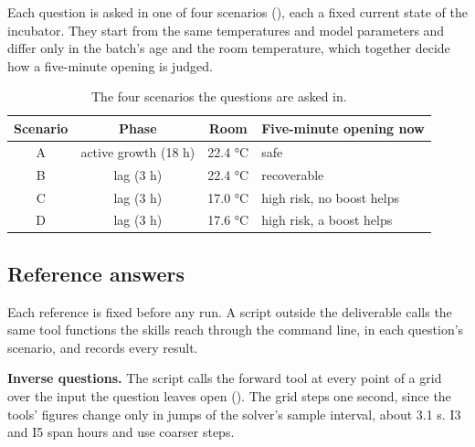   Each question is asked in one of four scenarios (), each a fixed current
  state of the incubator. They start from the same temperatures and model parameters and differ
  only in the batch's age and the room temperature, which together decide how a five-minute
  opening is judged.

  \begin{table}[H]
    \centering
    \begin{tabular}{@{}cccl@{}}
      \toprule
      \textbf{Scenario} & \textbf{Phase} & \textbf{Room} & \textbf{Five-minute opening now} \\
      \midrule
      A & active growth (18 h) & 22.4 \si{\celsius} & safe \\
      B & lag (3 h)            & 22.4 \si{\celsius} & recoverable \\
      C & lag (3 h)            & 17.0 \si{\celsius} & high risk, no boost helps \\
      D & lag (3 h)            & 17.6 \si{\celsius} & high risk, a boost helps \\
      \bottomrule
    \end{tabular}
    \caption{The four scenarios the questions are asked in.}
    \label{tab:scenarios}
  \end{table}


  \subsection{Reference answers}
  \label{sec:reference}

  Each reference is fixed before any run. A script outside the deliverable calls the same tool
  functions the skills reach through the command line, in each question's scenario, and records
  every result.

  \textbf{Inverse questions.} The script calls the forward tool at every point of a grid over the
  input the question leaves open (). The grid steps one second, since the
  tools' figures change only in jumps of the solver's sample interval, about 3.1 s. I3 and I5 span
  hours and use coarser steps.

